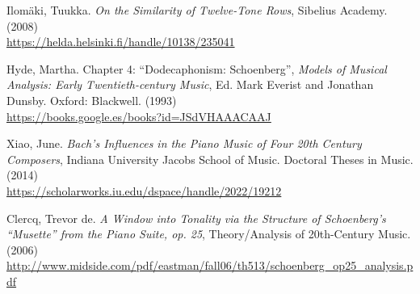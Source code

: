 \begin{thebibliography}{00}
			
			{ Ilom\"aki, Tuukka.}
			\textit{On the Similarity of Twelve-Tone Rows},
			Sibelius Academy.
			(2008)
			\\\url{https://helda.helsinki.fi/handle/10138/235041}
			
			{ Hyde, Martha.} Chapter 4: ``Dodecaphonism: Schoenberg'',
			\textit{Models of Musical Analysis: Early Twentieth-century Music},
			Ed. Mark Everist and Jonathan Dunsby.
			Oxford: Blackwell.
			(1993)
			\\\url{https://books.google.es/books?id=JSdVHAAACAAJ}			
					
			{ Xiao, June.} 
			\textit{Bach's Influences in the Piano Music of Four 20th Century Composers},
			Indiana University Jacobs School of Music.
			Doctoral Theses in Music.
			(2014)
			\\\url{https://scholarworks.iu.edu/dspace/handle/2022/19212}
			
			{ Clercq, Trevor de.} 
			\textit{A Window into Tonality via the Structure of Schoenberg's ``Musette'' from the Piano Suite, op. 25},
			Theory/Analysis of 20th-Century Music.
			(2006)
			\\\url{http://www.midside.com/pdf/eastman/fall06/th513/schoenberg_op25_analysis.pdf}
			

\end{thebibliography}
